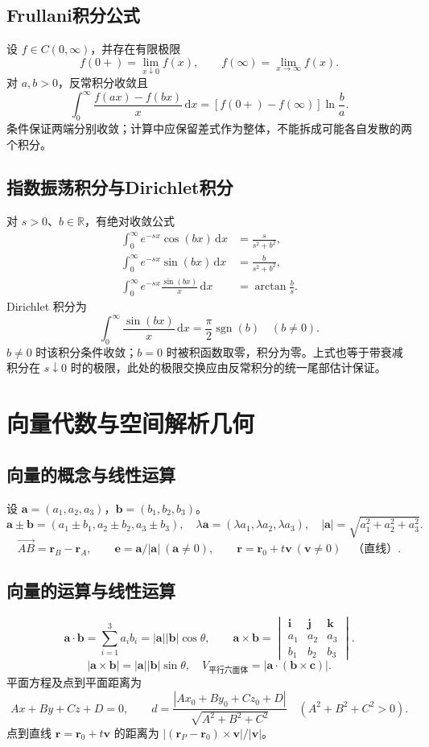 \documentclass[../main.tex]{subfiles}
\begin{document}
\subsection{Frullani积分公式}
设 $f\in C(0,\infty)$，并存在有限极限
\[
f(0+)=\lim_{x\downarrow0}f(x),\qquad
f(\infty)=\lim_{x\to\infty}f(x).
\]
对 $a,b>0$，反常积分收敛且
\[
\int_0^\infty\frac{f(ax)-f(bx)}x\,\mathrm dx
=[f(0+)-f(\infty)]\ln\frac ba.
\]
条件保证两端分别收敛；计算中应保留差式作为整体，不能拆成可能各自发散的两个积分。
\subsection{指数振荡积分与Dirichlet积分}
对 $s>0$、$b\in\mathbb R$，有绝对收敛公式
\begin{align*}
\int_0^\infty e^{-sx}\cos(bx)\,\mathrm dx&=\frac{s}{s^2+b^2},\\
\int_0^\infty e^{-sx}\sin(bx)\,\mathrm dx&=\frac{b}{s^2+b^2},\\
\int_0^\infty e^{-sx}\frac{\sin(bx)}x\,\mathrm dx
&=\arctan\frac bs.
\end{align*}
Dirichlet 积分为
\[
\int_0^\infty\frac{\sin(bx)}x\,\mathrm dx
=\frac\pi2\operatorname{sgn}(b)\quad(b\ne0).
\]
$b\ne0$ 时该积分条件收敛；$b=0$ 时被积函数取零，积分为零。上式也等于带衰减积分在 $s\downarrow0$ 时的极限，此处的极限交换应由反常积分的统一尾部估计保证。
\section{向量代数与空间解析几何}
\subsection{向量的概念与线性运算}
设 $\bm a=(a_1,a_2,a_3)$，$\bm b=(b_1,b_2,b_3)$。
\[
\bm a\pm\bm b=(a_1\pm b_1,a_2\pm b_2,a_3\pm b_3),\quad
\lambda\bm a=(\lambda a_1,\lambda a_2,\lambda a_3),\quad
|\bm a|=\sqrt{a_1^2+a_2^2+a_3^2}.
\]
\[
\overrightarrow{AB}=\bm r_B-\bm r_A,\qquad
\bm e=\bm a/|\bm a|\ (\bm a\ne0),\qquad
\bm r=\bm r_0+t\bm v\ (\bm v\ne0)\quad\text{（直线）}.
\]
\subsection{向量的运算与线性运算}
\[
\bm a\cdot\bm b=\sum_{i=1}^3a_ib_i=|\bm a||\bm b|\cos\theta,\qquad
\bm a\times\bm b=\begin{vmatrix}\bm i&\bm j&\bm k\\a_1&a_2&a_3\\b_1&b_2&b_3\end{vmatrix}.
\]
\[
|\bm a\times\bm b|=|\bm a||\bm b|\sin\theta,\quad
V_{\text{平行六面体}}=|\bm a\cdot(\bm b\times\bm c)|.
\]
平面方程及点到平面距离为
\[
Ax+By+Cz+D=0,\qquad
 d=\frac{|Ax_0+By_0+Cz_0+D|}{\sqrt{A^2+B^2+C^2}}\quad(A^2+B^2+C^2>0).
\]
点到直线 $\bm r=\bm r_0+t\bm v$ 的距离为 $| (\bm r_P-\bm r_0)\times\bm v|/|\bm v|$。
\end{document}
